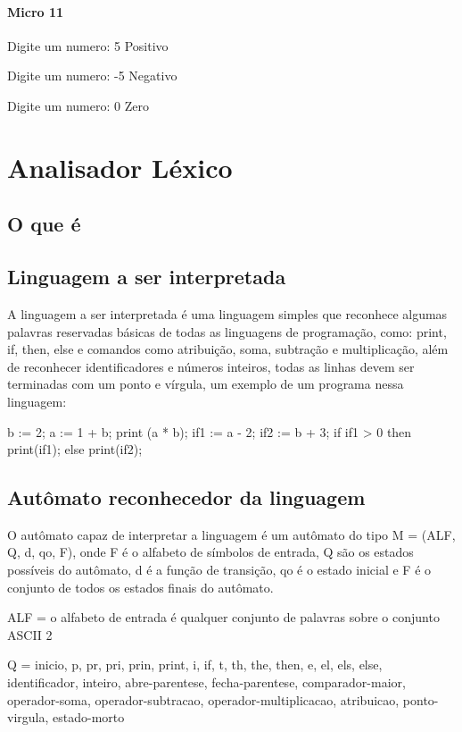 \documentclass[12pt,a4paper,twoside]{report}
\begin{document}
\subsubsection{Micro 11}


\begin{terminal}
Digite um numero: 5
Positivo

Digite um numero: -5
Negativo

Digite um numero: 0
Zero
\end{terminal}

\chapter{Analisador Léxico}
\section{O que é}
\section{Linguagem a ser interpretada}
A linguagem a ser interpretada é uma linguagem simples que reconhece algumas palavras reservadas básicas de todas as linguagens de programação, como: print, if, then, else e comandos como atribuição, soma, subtração e multiplicação, além de reconhecer identificadores e números inteiros, todas as linhas devem ser terminadas com um ponto e vírgula, um exemplo de um programa nessa linguagem:

\begin{terminal}
b := 2;
a := 1 + b;
print (a * b);
if1 := a - 2;
if2 := b + 3;
if if1 > 0
then print(if1);
else print(if2);
\end{terminal}


\section{Autômato reconhecedor da linguagem}
O autômato capaz de interpretar a linguagem é um autômato do tipo M = (ALF, Q, d, qo, F), onde F é o alfabeto de símbolos de entrada, Q são os estados possíveis do autômato, d é a função de transição, qo é o estado inicial e F é o conjunto de todos os estados finais do autômato.

ALF = o alfabeto de entrada é qualquer conjunto de palavras sobre o conjunto ASCII 2

Q = {inicio, p, pr, pri, prin, print, i, if, t, th, the, then, e, el, els, else, identificador, inteiro, abre-parentese, fecha-parentese, comparador-maior, operador-soma, operador-subtracao, operador-multiplicacao, atribuicao, ponto-virgula, estado-morto}
\end{document}
